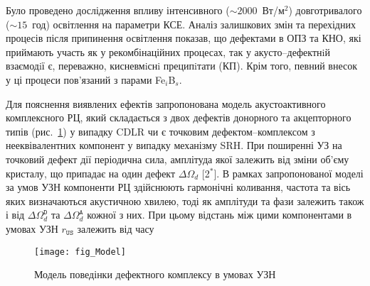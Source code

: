 Було проведено дослідження впливу інтенсивного ($\sim2000$~Вт/м$^2$) довготривалого ($\sim15$~год) освітлення на параметри КСЕ.
Аналіз залишкових змін та перехідних процесів після припинення освітлення показав, що дефектами в ОПЗ та КНО, які приймають участь як у рекомбінаційних процесах, так у акусто--дефектнiй взаємодiї є, переважно, кисневмiснi преципiтати (КП).
Крім того, певний внесок у ці процеси пов'язаний з парами Fe$_i$B$_s$.

Для пояснення виявлених ефектів запропонована модель акустоактивного комплексного РЦ, який складається
з двох дефектів донорного та акцепторного типів (рис.~\ref{fig_Model}) у випадку CDLR  чи є точковим дефектом--комплексом з нееквівалентних компонент у випадку механізму SRH.
При поширенні УЗ на точковий дефект дії періодична сила, амплітуда якої залежить від зміни об'єму кристалу, що припадає на один дефект $\Delta\Omega_d$
[2$^*$].
В рамках запропонованої моделі за умов УЗН компоненти РЦ здійснюють гармонічні коливання, частота та вісь яких визначаються акустичною хвилею, тоді як амплітуди та фази залежить також і від  $\Delta\Omega_d^\mathtt{D}$ та
$\Delta\Omega_d^\mathtt{A}$ кожної з них.
При цьому відстань між цими компонентами в умовах УЗН $r_\mathtt{US}$ залежить від часу

\begin{figure}[ht]
\center
\texttt{[image: fig\_Model]}
\caption{\label{fig_Model}
Модель поведінки дефектного комплексу в умовах УЗН
}%
\end{figure}

